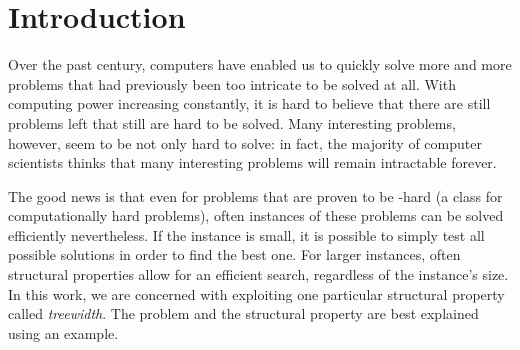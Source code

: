 \documentclass[thesis.tex]{subfiles}
\begin{document}
\chapter{Introduction}
   \label{ch:Introduction}
%


Over the past century, computers have enabled us to quickly solve more and more problems that had previously been too intricate to be solved at all. With computing power increasing constantly, it is hard to believe that there are still problems left that still are hard to be solved. Many interesting problems, however, seem to be not only hard to solve: in fact, the majority of computer scientists thinks that many interesting problems will remain intractable forever. %

The good news is that even for problems that are proven to be \NP-hard (a class for computationally hard problems), often instances of these problems can be solved efficiently nevertheless. If the instance is small, it is possible to simply test all possible solutions in order to find the best one. For larger instances, often structural properties allow for an efficient search, regardless of the instance's size. In this work, we are concerned with exploiting one particular structural property called \emph{treewidth}. The problem and the structural property are best explained using an example.
\end{document}
